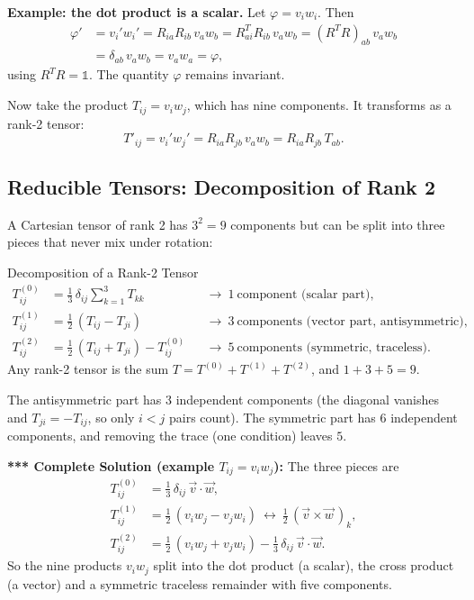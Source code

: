 \documentclass[11pt,a4paper]{article}
\begin{document}
\textbf{Example: the dot product is a scalar.} Let $\varphi=v_iw_i$. Then
\begin{align*}
\varphi'&=v_i'w_i'=R_{ia}R_{ib}\,v_aw_b=R^T_{ai}R_{ib}\,v_aw_b=(R^TR)_{ab}\,v_aw_b\\
&=\delta_{ab}\,v_aw_b=v_aw_a=\varphi ,
\end{align*}
using $R^TR=\mathbb 1$. The quantity $\varphi$ remains invariant.

Now take the product $T_{ij}=v_iw_j$, which has nine components. It transforms as a rank-2 tensor:
\[
T'_{ij}=v_i'w_j'=R_{ia}R_{jb}\,v_aw_b=R_{ia}R_{jb}\,T_{ab}.
\]

\subsection{Reducible Tensors: Decomposition of Rank 2}
A Cartesian tensor of rank 2 has $3^2=9$ components but can be split into three pieces that never mix under rotation:
\begin{thm}{Decomposition of a Rank-2 Tensor}
\begin{align*}
T^{(0)}_{ij}&=\tfrac13\,\delta_{ij}\sum_{k=1}^{3}T_{kk}&&\to\ 1\ \text{component (scalar part)},\\
T^{(1)}_{ij}&=\tfrac12\,(T_{ij}-T_{ji})&&\to\ 3\ \text{components (vector part, antisymmetric)},\\
T^{(2)}_{ij}&=\tfrac12\,(T_{ij}+T_{ji})-T^{(0)}_{ij}&&\to\ 5\ \text{components (symmetric, traceless)}.
\end{align*}
Any rank-2 tensor is the sum $T=T^{(0)}+T^{(1)}+T^{(2)}$, and $1+3+5=9$.
\end{thm}

The antisymmetric part has $3$ independent components (the diagonal vanishes and $T_{ji}=-T_{ij}$, so only $i<j$ pairs count). The symmetric part has $6$ independent components, and removing the trace (one condition) leaves $5$.

\textbf{*** Complete Solution (example $T_{ij}=v_iw_j$):} The three pieces are
\begin{align*}
T^{(0)}_{ij}&=\tfrac13\,\delta_{ij}\,\vec v\cdot\vec w,\\
T^{(1)}_{ij}&=\tfrac12\,(v_iw_j-v_jw_i)\ \leftrightarrow\ \tfrac12\,(\vec v\times\vec w\,)_k,\\
T^{(2)}_{ij}&=\tfrac12\,(v_iw_j+v_jw_i)-\tfrac13\,\delta_{ij}\,\vec v\cdot\vec w .
\end{align*}
So the nine products $v_iw_j$ split into the dot product (a scalar), the cross product (a vector) and a symmetric traceless remainder with five components.
\end{document}

